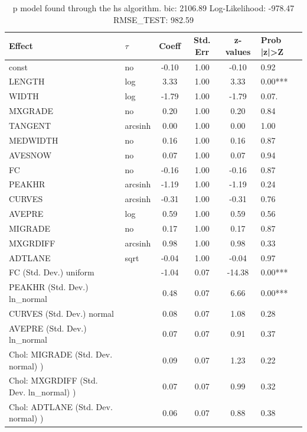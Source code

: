 \begin{table}
	\caption{p model found through the hs algorithm. bic: 2106.89 Log-Likelihood: -978.47 RMSE_TEST: 982.59}
	\begin{center}
		\begin{tabular}{|l|l|c|c|c|l|}
			\hline
			Effect & $\tau$ & Coeff & Std. Err & z-values & Prob |z|>Z \\
			\hline
			const & no & -0.10 & 1.00 & -0.10 & 0.92 \\
			\hline
			LENGTH & log & 3.33 & 1.00 & 3.33 & 0.00*** \\
			\hline
			WIDTH & log & -1.79 & 1.00 & -1.79 & 0.07. \\
			\hline
			MXGRADE & no & 0.20 & 1.00 & 0.20 & 0.84 \\
			\hline
			TANGENT & arcsinh & 0.00 & 1.00 & 0.00 & 1.00 \\
			\hline
			MEDWIDTH & no & 0.16 & 1.00 & 0.16 & 0.87 \\
			\hline
			AVESNOW & no & 0.07 & 1.00 & 0.07 & 0.94 \\
			\hline
			FC & no & -0.16 & 1.00 & -0.16 & 0.87 \\
			\hline
			PEAKHR & arcsinh & -1.19 & 1.00 & -1.19 & 0.24 \\
			\hline
			CURVES & arcsinh & -0.31 & 1.00 & -0.31 & 0.76 \\
			\hline
			AVEPRE & log & 0.59 & 1.00 & 0.59 & 0.56 \\
			\hline
			MIGRADE & no & 0.17 & 1.00 & 0.17 & 0.87 \\
			\hline
			MXGRDIFF & arcsinh & 0.98 & 1.00 & 0.98 & 0.33 \\
			\hline
			ADTLANE & sqrt & -0.04 & 1.00 & -0.04 & 0.97 \\
			\hline
			FC (Std. Dev.) uniform &  & -1.04 & 0.07 & -14.38 & 0.00*** \\
			\hline
			PEAKHR (Std. Dev.) ln_normal &  & 0.48 & 0.07 & 6.66 & 0.00*** \\
			\hline
			CURVES (Std. Dev.) normal &  & 0.08 & 0.07 & 1.08 & 0.28 \\
			\hline
			AVEPRE (Std. Dev.) ln_normal &  & 0.07 & 0.07 & 0.91 & 0.37 \\
			\hline
			 Chol: MIGRADE (Std. Dev. normal) ) &  & 0.09 & 0.07 & 1.23 & 0.22 \\
			\hline
			 Chol: MXGRDIFF (Std. Dev. ln_normal) ) &  & 0.07 & 0.07 & 0.99 & 0.32 \\
			\hline
			 Chol: ADTLANE (Std. Dev. normal) ) &  & 0.06 & 0.07 & 0.88 & 0.38 \\

\end{tabular}
\end{center}
\end{table}
